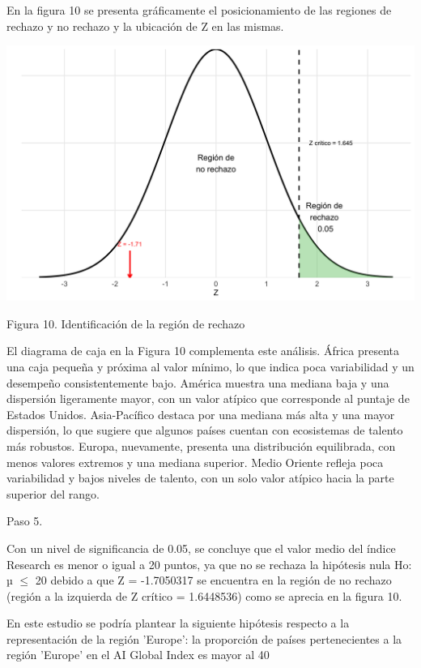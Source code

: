 \documentclass[
]{article}
\begin{document}
\begin{multicols}{2}
En la figura 10 se presenta gráficamente el posicionamiento de las regiones de rechazo y no rechazo y la ubicación de Z en las mismas.


\begin{center}
\includegraphics[width=\linewidth]{figura10.png}
\end{center}

Figura 10. Identificación de la región de rechazo


El diagrama de caja en la Figura 10 complementa este análisis. África presenta una caja pequeña y próxima al valor mínimo, lo que indica poca variabilidad y un desempeño consistentemente bajo. América muestra una mediana baja y una dispersión ligeramente mayor, con un valor atípico que corresponde al puntaje de Estados Unidos. Asia-Pacífico destaca por una mediana más alta y una mayor dispersión, lo que sugiere que algunos países cuentan con ecosistemas de talento más robustos. Europa, nuevamente, presenta una distribución equilibrada, con menos valores extremos y una mediana superior. Medio Oriente refleja poca variabilidad y bajos niveles de talento, con un solo valor atípico hacia la parte superior del rango.


Paso 5.

Con un nivel de significancia de 0.05, se concluye que el valor medio del índice Research es menor o igual a 20 puntos, ya que no se rechaza la hipótesis nula Ho: µ $≤$ 20 debido a que Z = -1.7050317 se encuentra en la región de no rechazo (región a la izquierda de Z crítico = 1.6448536) como se aprecia en la figura 10.

En este estudio se podría plantear la siguiente hipótesis respecto a la representación de la región 'Europe': la proporción de países pertenecientes a la región 'Europe' en el AI Global Index es mayor al 40%


\end{multicols}
\end{document}
